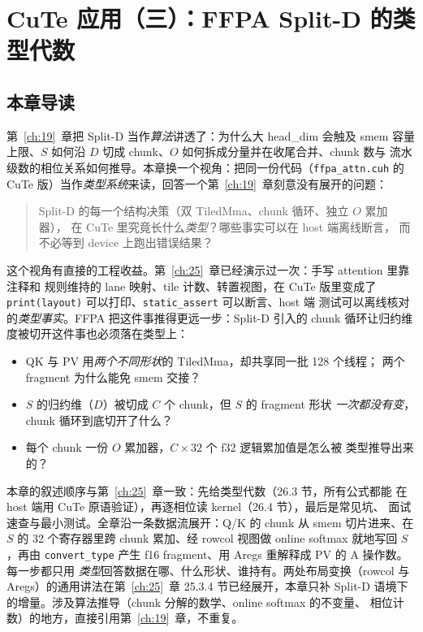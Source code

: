 \chapter{CuTe 应用（三）：FFPA Split-D 的类型代数}\label{ch:26}

\section{本章导读}

第~\ref{ch:19}~章把 Split-D 当作\emph{算法}讲透了：为什么大 head\_dim 会触及
smem 容量上限、$S$ 如何沿 $D$ 切成 chunk、$O$ 如何拆成分量并在收尾合并、chunk 数与
流水级数的相位关系如何推导。本章换一个视角：把同一份代码（\texttt{ffpa\_\allowbreak{}attn.\allowbreak{}cuh}
的 CuTe 版）当作\emph{类型系统}来读，回答一个第~\ref{ch:19}~章刻意没有展开的问题：

\begin{quote}
  Split-D 的每一个结构决策（双 TiledMma、chunk 循环、独立 $O$ 累加器），
  在 CuTe 里究竟长什么\emph{类型}？哪些事实可以在 host 端离线断言，
  而不必等到 device 上跑出错误结果？
\end{quote}

这个视角有直接的工程收益。第~\ref{ch:25}~章已经演示过一次：手写 attention 里靠注释和
规则维持的 lane 映射、tile 计数、转置视图，在 CuTe 版里变成了
\texttt{print\allowbreak{}(layout)} 可以打印、\texttt{static\_\allowbreak{}assert} 可以断言、host 端
测试可以离线核对的\emph{类型事实}。FFPA 把这件事推得更远一步：Split-D 引入的
chunk 循环让归约维度被切开这件事也必须落在类型上：

\begin{itemize}[itemsep=2pt,topsep=2pt]
  \item QK 与 PV 用\emph{两个不同形状}的 TiledMma，却共享同一批 128 个线程；
        两个 fragment 为什么能免 smem 交接？
  \item $S$ 的归约维（$D$）被切成 $C$ 个 chunk，但 $S$ 的 fragment 形状
        \emph{一次都没有变}，chunk 循环到底切开了什么？
  \item 每个 chunk 一份 $O$ 累加器，$C\times 32$ 个 f32 逻辑累加值是怎么被
        类型推导出来的？
\end{itemize}

本章的叙述顺序与第~\ref{ch:25}~章一致：先给类型代数（26.3 节，所有公式都能
在 host 端用 CuTe 原语验证），再逐相位读 kernel（26.4 节），最后是常见坑、
面试速查与最小测试。全章沿一条数据流展开：Q/K 的 chunk 从 smem
切片进来、在 $S$ 的 32 个寄存器里跨 chunk 累加、经 rowcol 视图做 online
softmax 就地写回 $S$，再由 \texttt{convert\_type} 产生 f16 fragment、用 Aregs
重解释成 PV 的 A 操作数。每一步都只用
\emph{类型}回答数据在哪、什么形状、谁持有。两处布局变换（rowcol 与
Aregs）的通用讲法在第~\ref{ch:25}~章 25.3.4 节已经展开，本章只补 Split-D
语境下的增量。涉及算法推导（chunk 分解的数学、online softmax 的不变量、
相位计数）的地方，直接引用第~\ref{ch:19}~章，不重复。

